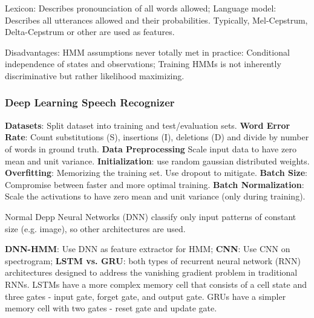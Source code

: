 Lexicon: Describes pronounciation of all words allowed; Language model: Describes all utterances allowed and their probabilities.
Typically, Mel-Cepstrum, Delta-Cepstrum or other are used as features.

Disadvantages: HMM assumptions never totally met in practice: Conditional independence of states and observations;
Training HMMs is not inherently discriminative but rather likelihood maximizing.

\subsubsection{Deep Learning Speech Recognizer}
\textbf{Datasets}: Split dataset into training and test/evaluation sets.
\textbf{Word Error Rate}: Count substitutions (S), insertions (I), deletions (D) and divide by number of words in ground truth.
\textbf{Data Preprocessing} Scale input data to have zero mean and unit variance.
\textbf{Initialization}: use random gaussian distributed weights.
\textbf{Overfitting}: Memorizing the training set. Use dropout to mitigate.
\textbf{Batch Size}: Compromise between faster and more optimal training.
\textbf{Batch Normalization}: Scale the activations to have zero mean and unit variance (only during training).

Normal Depp Neural Networks (DNN) classify only input patterns of constant size (e.g. image), so other architectures are used.

\textbf{DNN-HMM}: Use DNN as feature extractor for HMM; \textbf{CNN}: Use CNN on spectrogram;
\textbf{LSTM vs. GRU}: both types of recurrent neural network (RNN) architectures designed to address the vanishing gradient problem in traditional RNNs.
LSTMs have a more complex memory cell that consists of a cell state and three gates - input gate, forget gate, and output gate.
GRUs have a simpler memory cell with two gates - reset gate and update gate.
